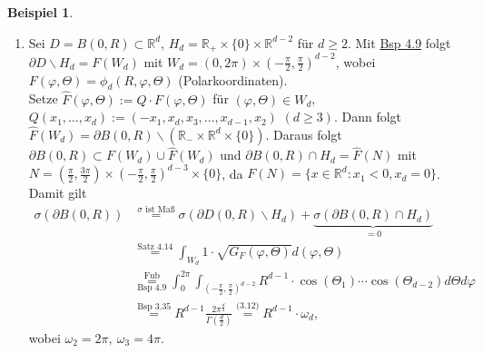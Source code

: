 \documentclass[a4paper]{scrreprt}
\newcommand{\R}{\mathbb{R}}
\newcommand{\overunderset}[3]{\overset{#1}{\underset{#3}{#2}}}
\newcommand{\jlabel}[1]{\label{j_#1}}
\newcommand{\jshortlink}[1]{\jhyperref{#1}{\text{#1}}}
\newcommand{\jhyperref}[2]{\hyperref[j_#1]{#2}}
\newcommand{\jlink}[1]{\jhyperref{#1}{#1}}
\newcommand{\jshortlinkFubini}{\jhyperref{Fubini}{\text{Fub}}}
\theoremstyle{plain}
\theoremstyle{definition}
\newtheorem{expl}[thm]{Beispiel}
\begin{document}
{{{{\jlabel{Bsp 4.15}
\begin{expl}
    \begin{enumerate}
        \item
            \jlabel{Bsp 4.15a)}
            Sei $D=B(0,R) \subset \R^d$, $H_d = \R_+ \times \{0\} \times \R^{d-2}$ für $d\ge 2$. Mit \jlink{Bsp 4.9} folgt $\partial D\backslash H_d = F(W_d)$ mit $W_d = (0,2\pi)\times (-\frac{\pi}{2}, \frac{\pi}{2})^{d-2}$, wobei $F(\varphi, \Theta) = \phi_d(R,\varphi, \Theta)$ (Polarkoordinaten).\\
            Setze $\hat{F}(\varphi,\Theta) := Q\cdot F(\varphi,\Theta)$ für $(\varphi,\Theta) \in W_d$,\\ $Q(x_1,\dots,x_d) := (-x_1,x_d,x_3,\dots,x_{d-1},x_2)$ $(d\ge 3)$. Dann folgt $\hat{F}(W_d) = \partial B(0,R) \backslash (\R_-\times \R^d\times \{0\})$. Daraus folgt $\partial B(0,R) \subset F(W_d) \cup \hat{F}(W_d)$ und $\partial B(0,R)\cap H_d = \hat{F}(N)$ mit $N = \left(\frac{\pi}{2}, \frac{3\pi}{2} \right) \times \left(-\frac{\pi}{2},\frac{\pi}{2}  \right)^{d-3} \times \{0\}$, da $F(N) = \{x\in\R^d : x_1 < 0, x_d = 0\}$. Damit gilt
            \[
                \begin{split}
                    \sigma(\partial B(0,R)) &\overset{\sigma \text{ ist Maß}}{=} \sigma(\partial D(0,R)\backslash H_d) + \underbrace{\sigma(\partial B(0,R)\cap H_d)}_{=0}\\
                    &\overset{\jshortlink{Satz 4.14}}{=} \int_{W_d} 1 \cdot \sqrt{G_F(\varphi, \Theta)} d(\varphi, \Theta)\\
                    &\overunderset{\jshortlinkFubini}{=}{\jshortlink{Bsp 4.9}} \int_0^{2\pi} \int_{\left(-\frac{\pi}{2},\frac{\pi}{2} \right)^{d-2}} R^{d-1}\cdot \cos(\Theta_1)\cdots \cos(\Theta_{d-2}) d\Theta d\varphi\\
                    &\overset{\jshortlink{Bsp 3.35}}{=} R^{d-1} \frac{2\pi^\frac{d}{2}}{\Gamma\left(\frac{d}{2}\right)} \overset{\jshortlink{(3.12)}}{=} R^{d-1}\cdot \omega_d,
                 \end{split}
            \]
            wobei $\omega_2 = 2\pi,\ \omega_3 = 4\pi$.
            

\end{enumerate}
\end{expl}}}}}
\end{document}
